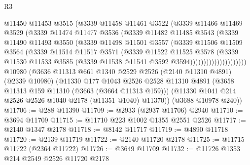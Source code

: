\begin{lexlean}{R3}
\begin{coremodule}
                        @11450
                        @11453
                        @3515
                        (@3339
                          @11458
                          @11461
                          @3522
                          (@3339
                            @11466
                            @11469
                            @3529
                            (@3339
                              @11474
                              @11477
                              @3536
                              (@3339
                                @11482
                                @11485
                                @3543
                                (@3339
                                  @11490
                                  @11493
                                  @3550
                                  (@3339
                                    @11498
                                    @11501
                                    @3557
                                    (@3339
                                      @11506
                                      @11509
                                      @3564
                                      (@3339
                                        @11514
                                        @11517
                                        @3571
                                        (@3339
                                          @11522
                                          @11525
                                          @3578
                                          (@3339
                                            @11530
                                            @11533
                                            @3585
                                            (@3339 @11538 @11541 @3592 @3594)))))))))))))))))))))
    @10980
    (@3636
      @11313
      @661
      @1340
      @2529
      @2526
      (@2140 @11310 @4891)
      (@2339 @10980)
      (@11330
        @177
        @1043
        @2526
        @2528
        @11310
        @4891
        (@3658 @11313 @159 @11310 (@3663 (@3664 @11313 @159)))
        (@11330 @1041 @214 @2526 @2526 @1040 @2178 (@11351 @1040) @11370))
      (@3688 @10978 @240))
@11706 := @288 @11390
@11709 := @2933 (@2937 @11706) @2940
@11710 := @3694 @11709
@11715 := @11710 @223 @1002 @1355 @2551 @2526
@11717 := @2140 @1347 @2178
@11718 := @8142 @11717
@11719 := @4890 @11718
@11720 := @2139 @11719
@11722 := @2140 @11720 @2178
@11725 := @11715 @11722 (@2364 @11722)
@11726 := @3649 @11709
@11732 := @11726 @1353 @214 @2549 @2526 @11720 @2178

\end{coremodule}
\end{lexlean}
